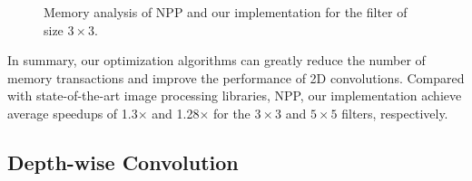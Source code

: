 \begin{figure}
\centering

\hspace{0em}
	
\caption{Memory analysis of NPP and our implementation for the filter of size $3 \times 3$.}
\label{fig:2dmemanaly}
\end{figure}


In summary, our optimization algorithms can greatly reduce the number of memory transactions and improve the performance of 2D
convolutions. Compared with state-of-the-art image processing libraries, NPP, our implementation achieve average speedups of 1.3$\times$ and 1.28$\times$ for the $3 \times 3$ and $5 \times 5$ filters, respectively.

\subsection{Depth-wise Convolution}
\label{sec:depconvexp}

